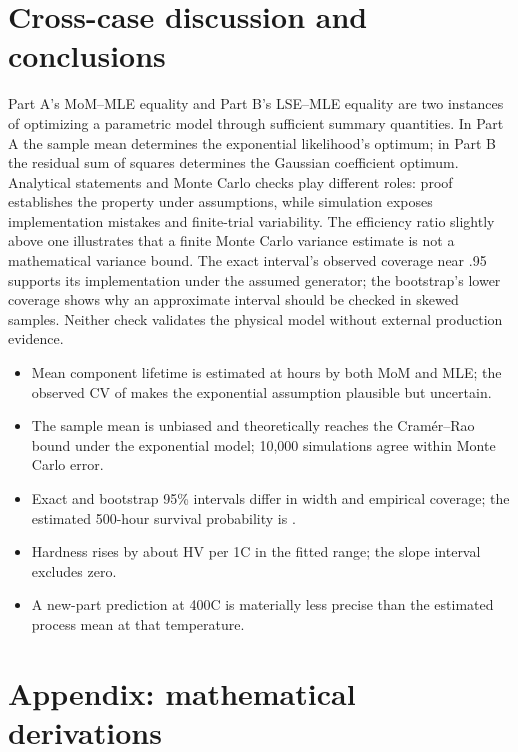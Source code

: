 \documentclass[11pt,a4paper]{article}
\newcommand{\sectionpage}[2]{\clearpage\pagecolor{#1}\section{#2}}
\begin{document}
\sectionpage{softblue}{Cross-case discussion and conclusions}
Part A's MoM--MLE equality and Part B's LSE--MLE equality are two instances of optimizing a parametric model through sufficient summary quantities. In Part A the sample mean determines the exponential likelihood's optimum; in Part B the residual sum of squares determines the Gaussian coefficient optimum. Analytical statements and Monte Carlo checks play different roles: proof establishes the property under assumptions, while simulation exposes implementation mistakes and finite-trial variability. The efficiency ratio slightly above one illustrates that a finite Monte Carlo variance estimate is not a mathematical variance bound. The exact interval's observed coverage near .95 supports its implementation under the assumed generator; the bootstrap's lower coverage shows why an approximate interval should be checked in skewed samples. Neither check validates the physical model without external production evidence.

\begin{itemize}
\item Mean component lifetime is estimated at \ThetaMLE{} hours by both MoM and MLE; the observed CV of \LifeCV{} makes the exponential assumption plausible but uncertain.
\item The sample mean is unbiased and theoretically reaches the Cram\'er--Rao bound under the exponential model; 10,000 simulations agree within Monte Carlo error.
\item Exact and bootstrap 95\% intervals differ in width and empirical coverage; the estimated 500-hour survival probability is \Reliability.
\item Hardness rises by about \Slope{} HV per 1\textdegree C in the fitted range; the slope interval excludes zero.
\item A new-part prediction at 400\textdegree C is materially less precise than the estimated process mean at that temperature.
\end{itemize}

\section{Appendix: mathematical derivations}\label{sec:derivation}
\end{document}
